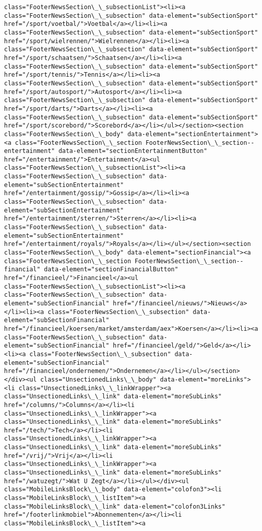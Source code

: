 \documentclass[11pt]{article}
\begin{document}
\begin{Verbatim}[commandchars=\\\{\}]
class="FooterNewsSection\_\_subsectionList"><li><a class="FooterNewsSection\_\_subsection" data-element="subSectionSport" href="/sport/voetbal/">Voetbal</a></li><li><a class="FooterNewsSection\_\_subsection" data-element="subSectionSport" href="/sport/wielrennen/">Wielrennen</a></li><li><a class="FooterNewsSection\_\_subsection" data-element="subSectionSport" href="/sport/schaatsen/">Schaatsen</a></li><li><a class="FooterNewsSection\_\_subsection" data-element="subSectionSport" href="/sport/tennis/">Tennis</a></li><li><a class="FooterNewsSection\_\_subsection" data-element="subSectionSport" href="/sport/autosport/">Autosport</a></li><li><a class="FooterNewsSection\_\_subsection" data-element="subSectionSport" href="/sport/darts/">Darts</a></li><li><a class="FooterNewsSection\_\_subsection" data-element="subSectionSport" href="/sport/scorebord/">Scorebord</a></li></ul></section><section class="FooterNewsSection\_\_body" data-element="sectionEntertainment"><a class="FooterNewsSection\_\_section FooterNewsSection\_\_section--entertainment" data-element="sectionEntertainmentButton" href="/entertainment/">Entertainment</a><ul class="FooterNewsSection\_\_subsectionList"><li><a class="FooterNewsSection\_\_subsection" data-element="subSectionEntertainment" href="/entertainment/gossip/">Gossip</a></li><li><a class="FooterNewsSection\_\_subsection" data-element="subSectionEntertainment" href="/entertainment/sterren/">Sterren</a></li><li><a class="FooterNewsSection\_\_subsection" data-element="subSectionEntertainment" href="/entertainment/royals/">Royals</a></li></ul></section><section class="FooterNewsSection\_\_body" data-element="sectionFinancial"><a class="FooterNewsSection\_\_section FooterNewsSection\_\_section--financial" data-element="sectionFinancialButton" href="/financieel/">Financieel</a><ul class="FooterNewsSection\_\_subsectionList"><li><a class="FooterNewsSection\_\_subsection" data-element="subSectionFinancial" href="/financieel/nieuws/">Nieuws</a></li><li><a class="FooterNewsSection\_\_subsection" data-element="subSectionFinancial" href="/financieel/koersen/market/amsterdam/aex">Koersen</a></li><li><a class="FooterNewsSection\_\_subsection" data-element="subSectionFinancial" href="/financieel/geld/">Geld</a></li><li><a class="FooterNewsSection\_\_subsection" data-element="subSectionFinancial" href="/financieel/ondernemen/">Ondernemen</a></li></ul></section></div><ul class="UnsectionedLinks\_\_body" data-element="moreLinks"><li class="UnsectionedLinks\_\_linkWrapper"><a class="UnsectionedLinks\_\_link" data-element="moreSubLinks" href="/columns/">Columns</a></li><li class="UnsectionedLinks\_\_linkWrapper"><a class="UnsectionedLinks\_\_link" data-element="moreSubLinks" href="/tech/">Tech</a></li><li class="UnsectionedLinks\_\_linkWrapper"><a class="UnsectionedLinks\_\_link" data-element="moreSubLinks" href="/vrij/">Vrij</a></li><li class="UnsectionedLinks\_\_linkWrapper"><a class="UnsectionedLinks\_\_link" data-element="moreSubLinks" href="/watuzegt/">Wat U Zegt</a></li></ul></div><ul class="MobileLinksBlock\_\_body" data-element="colofon3"><li class="MobileLinksBlock\_\_listItem"><a class="MobileLinksBlock\_\_link" data-element="colofon3Links" href="/footerlinkmobiel">Abonnementen</a></li><li class="MobileLinksBlock\_\_listItem"><a 
\end{Verbatim}
\end{document}
